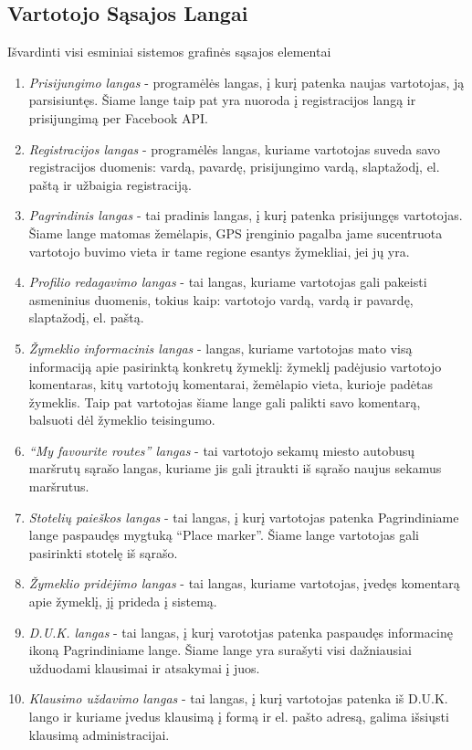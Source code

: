\documentclass{VUMIFPSkursinis}
\begin{document}
\subsection{Vartotojo Sąsajos Langai}
Išvardinti visi esminiai sistemos grafinės sąsajos elementai
				\begin{enumerate}[label=VSL\arabic*,itemsep=-2mm]
					\item \textit{Prisijungimo langas} - programėlės langas, į kurį patenka naujas vartotojas, ją parsisiuntęs. Šiame lange taip pat yra nuoroda į registracijos langą ir prisijungimą per Facebook API.
					\item \textit{Registracijos langas} - programėlės langas, kuriame vartotojas suveda savo registracijos duomenis: vardą, pavardę, prisijungimo vardą, slaptažodį, el. paštą ir užbaigia registraciją.
					\item \textit{Pagrindinis langas} - tai pradinis langas, į kurį patenka prisijungęs vartotojas. Šiame lange matomas žemėlapis, GPS įrenginio pagalba jame sucentruota vartotojo buvimo vieta ir tame regione esantys žymekliai, jei jų yra.
					\item \textit{Profilio redagavimo langas} - tai langas, kuriame vartotojas gali pakeisti asmeninius duomenis, tokius kaip: vartotojo vardą, vardą ir pavardę, slaptažodį, el. paštą.
					\item \textit{Žymeklio informacinis langas} - langas, kuriame vartotojas mato visą informaciją apie pasirinktą konkretų žymeklį: žymeklį padėjusio vartotojo komentaras, kitų vartotojų komentarai, žemėlapio vieta, kurioje padėtas žymeklis. Taip pat vartotojas šiame lange gali palikti savo komentarą, balsuoti dėl žymeklio teisingumo. 
					\item \textit{“My favourite routes” langas} - tai vartotojo sekamų miesto autobusų maršrutų sąrašo langas, kuriame jis gali įtraukti iš sąrašo naujus sekamus maršrutus.
					\item \textit{Stotelių paieškos langas} - tai langas, į kurį vartotojas patenka Pagrindiniame lange paspaudęs mygtuką “Place marker”. Šiame lange vartotojas gali pasirinkti stotelę iš sąrašo.
					\item \textit{Žymeklio pridėjimo langas} -  tai langas, kuriame vartotojas, įvedęs komentarą apie žymeklį, jį prideda į sistemą.
					\item \textit{D.U.K. langas} - tai langas, į kurį varototjas patenka paspaudęs informacinę ikoną Pagrindiniame lange. Šiame lange yra surašyti visi dažniausiai užduodami klausimai ir atsakymai į juos.
					\item \textit{Klausimo uždavimo langas} - tai langas, į kurį vartotojas patenka iš D.U.K. lango ir kuriame įvedus klausimą į formą ir el. pašto adresą, galima išsiųsti klausimą administracijai.
				\end{enumerate}
\end{document}
